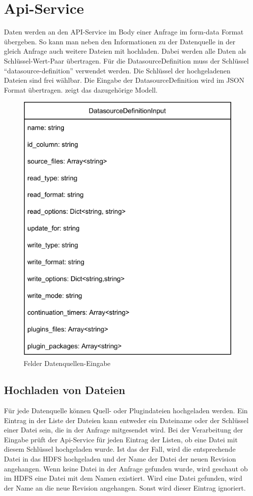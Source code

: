 \section{Api-Service}

Daten werden an den API-Service im Body einer Anfrage im form-data Format übergeben.
So kann man neben den Informationen zu der Datenquelle in der gleich Anfrage auch weitere Dateien mit hochladen.
Dabei werden alle Daten als Schlüssel-Wert-Paar übertragen.
Für die DatasourceDefinition muss der Schlüssel "`datasource-definition"' verwendet werden.
Die Schlüssel der hochgeladenen Dateien sind frei wählbar.
Die Eingabe der DatasourceDefinition wird im JSON Format übertragen.
 zeigt das dazugehörige Modell.

\begin{figure}
    \centering
    \includegraphics[width=.65\textwidth]{Grafiken/Umsetzung-Definition-Input.pdf}
    \caption{Felder Datenquellen-Eingabe}
    \label{fig:datasource-definition-input}
\end{figure}

\subsection{Hochladen von Dateien}

Für jede Datenquelle können Quell- oder Plugindateien hochgeladen werden.
Ein Eintrag in der Liste der Dateien kann entweder ein Dateiname oder der Schlüssel einer Datei sein, die in der Anfrage mitgesendet wird.
Bei der Verarbeitung der Eingabe prüft der Api-Service für jeden Eintrag der Listen, ob eine Datei mit diesem Schlüssel hochgeladen wurde.
Ist das der Fall, wird die entsprechende Datei in das HDFS hochgeladen und der Name der Datei der neuen Revision angehangen.
Wenn keine Datei in der Anfrage gefunden wurde, wird geschaut ob im HDFS eine Datei mit dem Namen existiert.
Wird eine Datei gefunden, wird der Name an die neue Revision angehangen.
Sonst wird dieser Eintrag ignoriert.
